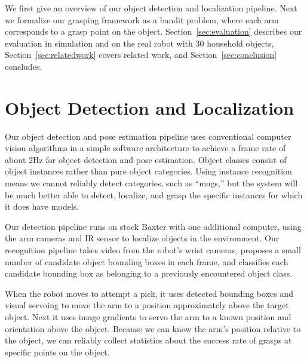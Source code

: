 \documentclass{article}
\begin{document}
We first give an overview of our object detection and localization pipeline.
Next we formalize our grasping framework as a bandit problem, where each
arm corresponds to a grasp point on the object.
Section~\ref{sec:evaluation} describes our evaluation in simulation
and on the real robot with $30$ household objects,
Section~\ref{sec:relatedwork} covers related work, and
Section~\ref{sec:conclusion} concludes.



\section{Object Detection and Localization}
Our object detection and pose estimation pipeline uses conventional
computer vision algorithms in a simple software architecture to
achieve a frame rate of about 2Hz for object detection and pose
estimation.  Object classes consist of object instances rather than
pure object categories.  Using instance recognition means we cannot
reliably detect categories, such as ``mugs,'' but the system will be
much better able to detect, localize, and grasp the specific instances for which
it does have models.

Our detection pipeline runs on stock Baxter with one additional
computer, using the arm cameras and IR sensor to localize objects in
the environment.  Our recognition pipeline takes video from the
robot's wrist cameras, proposes a small number of candidate object
bounding boxes in each frame, and classifies each candidate bounding
box as belonging to a previously encountered object class.

When the robot moves to attempt a pick, it uses detected bounding
boxes and visual servoing to move the arm to a position approximately
above the target object. Next it uses image gradients to servo the arm
to a known position and orientation above the object. Because we can
know the arm's position relative to the object, we can reliably
collect statistics about the success rate of grasps at specific points
on the object.
\end{document}
